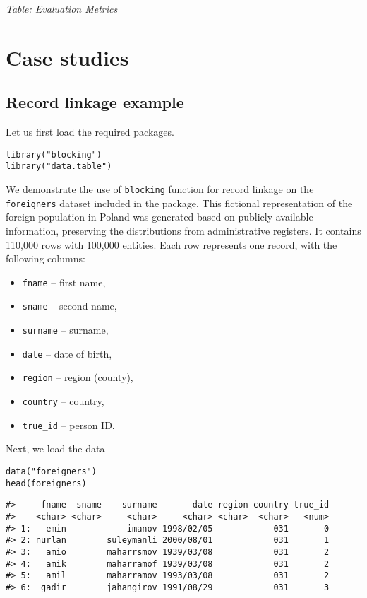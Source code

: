 \emph{Table: Evaluation Metrics}

\section{Case studies}\label{sec-case}

\subsection{Record linkage example}\label{record-linkage-example}

Let us first load the required packages.

\begin{verbatim}
library("blocking")
library("data.table")
\end{verbatim}

We demonstrate the use of \texttt{blocking} function for record linkage on the
\texttt{foreigners} dataset included in the package. This fictional
representation of the foreign population in Poland was generated based
on publicly available information, preserving the distributions from
administrative registers. It contains 110,000 rows with 100,000
entities. Each row represents one record, with the following columns:

\begin{itemize}
\tightlist
\item
  \texttt{fname} -- first name,
\item
  \texttt{sname} -- second name,
\item
  \texttt{surname} -- surname,
\item
  \texttt{date} -- date of birth,
\item
  \texttt{region} -- region (county),
\item
  \texttt{country} -- country,
\item
  \texttt{true\_id} -- person ID.
\end{itemize}

Next, we load the data

\begin{verbatim}
data("foreigners")
head(foreigners)
\end{verbatim}

\begin{verbatim}
#>     fname  sname    surname       date region country true_id
#>    <char> <char>     <char>     <char> <char>  <char>   <num>
#> 1:   emin            imanov 1998/02/05            031       0
#> 2: nurlan        suleymanli 2000/08/01            031       1
#> 3:   amio        maharrsmov 1939/03/08            031       2
#> 4:   amik        maharramof 1939/03/08            031       2
#> 5:   amil        maharramov 1993/03/08            031       2
#> 6:  gadir        jahangirov 1991/08/29            031       3
\end{verbatim}

